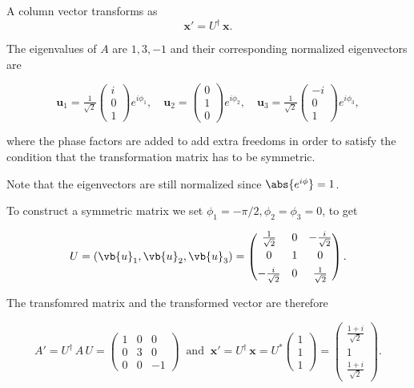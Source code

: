 \documentclass[a4paper,12pt]{report}
\begin{document}
{A column vector transforms as
\begin{equation}
\mathbf x' = U^\dagger\,\mathbf x.
\end{equation}

The eigenvalues of \(A\) are \(1,3,-1\) and their corresponding normalized eigenvectors are 

\begin{equation}
\mathbf u_1  = \tfrac1{\sqrt2}\begin{pmatrix}i\\0\\1\end{pmatrix}e^{i \phi _{1} } ,
\quad
\mathbf u_2  = \begin{pmatrix}0\\1\\0\end{pmatrix}e^{i \phi _{2} } ,
\quad
\mathbf u_3  = \tfrac1{\sqrt2}\begin{pmatrix}-i\\0\\1\end{pmatrix}e^{i \phi _{3} } ,
\end{equation}

where the phase factors are added to add extra freedoms in order to satisfy the condition that the transformation matrix has to be symmetric.

Note that the eigenvectors are still normalized since \(\abs{e^{i \phi } } = 1\). 

To construct a symmetric matrix we set \(\phi _{1} = - \pi /2 , \phi _{2} = \phi _{3} = 0  \), to get  

\begin{equation}
U = (\vb{u} _{1},\vb{u} _{2}, \vb{u} _{3}   ) = \begin{pmatrix}
\tfrac1{\sqrt2} & 0 & -\tfrac{i}{\sqrt2}\\[4pt]
0 & 1 & 0\\[4pt]
-\tfrac{i}{\sqrt2} & 0 & \tfrac1{\sqrt2}
\end{pmatrix}.
\end{equation}

The transfomred matrix and the transformed vector are therefore

\begin{equation}
A' = U^\dagger\,A\,U = \begin{pmatrix}1&0&0\\0&3&0\\0&0&-1\end{pmatrix} ~\text { and }~ \mathbf x' = U^\dagger\,\mathbf x
= U^* \begin{pmatrix}1\\1\\1\end{pmatrix}
= \begin{pmatrix}
\tfrac{1+i}{\sqrt2}\\[4pt]
1\\[4pt]
\tfrac{1+i}{\sqrt2}
\end{pmatrix}.
\end{equation}
~} 
\end{document}
